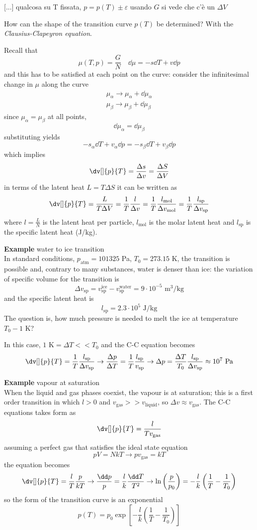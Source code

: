 
[...] qualcosa su T fissata, $p = p(T)\pm\varepsilon$ usando $G$ si vede che c'è
un $\Delta V$

How can the shape of the transition curve $p(T)$ be determined? With the \textit{
Clausius-Clapeyron equation}.

Recall that
$$\mu(T,p) = \frac{G}{N}\quad \dd\mu = - s \dd T + v\dd p$$
and this has to be satisfied at each point on the curve: consider the
infinitesimal change in $\mu$ along the curve
\begin{gather*}
    \mu_\alpha \rightarrow \mu_\alpha+\dd\mu_\alpha\\
    \mu_\beta \rightarrow \mu_\beta+\dd\mu_\beta
\end{gather*}
since $\mu_\alpha = \mu_\beta$ at all points,
$$\dd\mu_\alpha = \dd\mu_\beta$$
substituting yields
$$-s_\alpha\dd T + v_\alpha\dd p = -s_\beta\dd T + v_\beta \dd p$$
which implies
$$\dv[]{p}{T} = \frac{\Delta s}{\Delta v} = \frac{\Delta S}{\Delta V}$$
in terms of the latent heat $L = T\Delta S$ it can be written as
$$\dv[]{p}{T} = \frac{L}{T\Delta V} = \frac{1}{T}\frac{l}{\Delta v}=
\frac{1}{T}\frac{l_\text{mol}}{\Delta v_\text{mol}} = \frac{1}{T}\frac{l_\text{sp}}
{\Delta v_\text{sp}}$$
where $l = \frac{L}{N}$ is the latent heat per particle, $l_\text{mol}$ is
the molar latent heat and $l_\text{sp}$ is the specific latent heat (J/kg).

\textbf{Example} water to ice transition\\
In standard conditions, $p_\text{atm} = 101325$ Pa, $T_0 = 273.15$ K, the transition
is possible and, contrary to many substances, water is denser than ice: the variation
of specific volume for the transition is
$$\Delta v_\text{sp} = v^\text{ice}_\text{sp} - v^\text{water}_\text{sp} = 9\cdot
10^{-5}\text{ m}^3/\text{kg}$$
and the specific latent heat is
$$l_\text{sp} = 2.3\cdot10^{5}\text{ J/kg}$$
The question is, how much pressure is needed to melt the ice at temperature
$T_0-1$ K?

In this case, $1\text{ K} =\Delta T << T_0$ and the C-C equation becomes
$$\dv[]{p}{T} = \frac{1}{T}\frac{l_\text{sp}}{\Delta v_\text{sp}}\rightarrow
\frac{\Delta p}{\Delta T} = \frac{1}{T}\frac{l_\text{sp}}{v_\text{sp}}\rightarrow
\Delta p = \frac{\Delta T}{T_0} \frac{l_\text{sp}}{\Delta v_\text{sp}}\approx 10^7
\text{ Pa}
$$

\textbf{Example} vapour at saturation\\
When the liquid and gas phases coexist, the vapour is at saturation; this is a first
order transition in which $l>0$ and $v_\text{gas}>>v_\text{liquid}$, so $\Delta v 
\approx v_\text{gas}$. The C-C equations takes form as
$$\dv[]{p}{T} = \frac{l}{Tv_\text{gas}}$$
assuming a perfect gas that satisfies the ideal state equation
$$pV = NkT\rightarrow pv_\text{gas} = kT$$
the equation becomes
$$\dv[]{p}{T} = \frac{l}{T}\frac{p}{kT}\rightarrow \frac{\dd p}{p} = \frac{l}{k}
\frac{\dd T}{T^2}\rightarrow\ln\left(\frac{p}{p_0}\right) = -\frac{l}{k}\left(
\frac{1}{T}-\frac{1}{T_0}\right)$$
so the form of the transition curve is an exponential
$$p(T) = p_0\exp\left[-\frac{l}{k}\left(\frac{1}{T}-\frac{1}{T_0}\right)\right]$$

